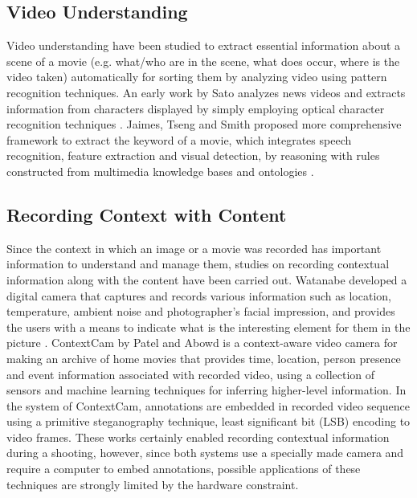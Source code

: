 \subsection{Video Understanding}

Video understanding have been studied to extract essential information about a scene of a movie (e.g. what/who are in the scene, what does occur, where is the video taken) automatically for sorting them by analyzing video using pattern recognition techniques.
An early work by Sato analyzes news videos and extracts information from characters displayed by simply employing optical character recognition techniques \cite{sato1998video}.
Jaimes, Tseng and Smith proposed more comprehensive framework to extract the keyword of a movie, which integrates speech recognition, feature extraction and visual detection, by reasoning with rules constructed from multimedia knowledge bases and ontologies \cite{jaimes2003modal}.

\subsection{Recording Context with Content}
Since the context in which an image or a movie was recorded has important information to understand and manage them, studies on recording contextual information along with the content have been carried out.
Watanabe developed a digital camera that captures and records various information such as location, temperature, ambient noise and photographer's facial impression, and provides the users with a means to indicate what is the interesting element for them in the picture \cite{Watanabe:2007:WDC:1240866.1241073}.
ContextCam by Patel and Abowd \cite{Patel04thecontextcam:} is a context-aware video camera for making an archive of home movies that provides time, location, person presence and event information associated with recorded video, using a collection of sensors and machine learning techniques for inferring higher-level information.
In the system of ContextCam, annotations are embedded in recorded video sequence using a primitive steganography technique, least significant bit (LSB) encoding to video frames.
These works certainly enabled recording contextual information during a shooting, however, since both systems use a specially made camera and require a computer to embed annotations, possible applications of these techniques are strongly limited by the hardware constraint.

